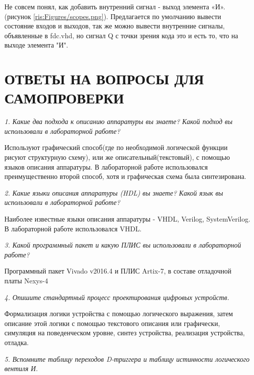 \begin{sloppypar}
Не совсем понял, как добавить  внутренний сигнал - выход элемента «И». (рисунок \ref{ris:Figures/scopes.png}). Предлагается по умолчанию вывести состояние входов и выходов, так же можно вывести внутренние сигналы, объявленные в fdc.vhd, но сигнал Q с точки зрения кода это и есть то, что на выходе элемента "И". 





\section*{ОТВЕТЫ НА ВОПРОСЫ ДЛЯ САМОПРОВЕРКИ}

\textit {1. Какие два подхода к описанию аппаратуры вы знаете? Какой подход
вы использовали в лабораторной работе?}

Используют графический способ(где по необходимой логической функции рисуют структурную схему), или же описательный(текстовый), с помощью языков описания аппаратуры. В лабораторной работе использовался преимущественно второй способ, хотя и графическая схема была синтезирована.

\textit {2. Какие языки описания аппаратуры (HDL) вы знаете? Какой язык вы
использовали в лабораторной работе?}

Наиболее известные языки описания аппаратуры  - VHDL, Verilog, SystemVerilog. В лабораторной работе использовался VHDL.

\textit {3. Какой программный пакет и какую ПЛИС вы использовали в лабораторной работе?}

Программный пакет Vivado v2016.4 и ПЛИС Artix-7, в составе отладочной платы Nexys-4

\textit {4. Опишите стандартный процесс проектирования цифровых устройств.}

Формализация логики устройства с помощью логического выражения, затем описание этой логики с помощью текстового описания или графически, симуляция на поведенческом уровне, синтез устройства, реализация устройства, отладка.

\textit {5. Вспомните таблицу переходов D-триггера и таблицу истинности логического вентиля И.}


\end{sloppypar}
